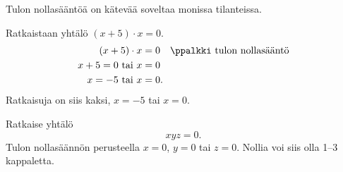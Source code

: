 

Tulon nollasääntöä on kätevää soveltaa monissa tilanteissa.

\begin{esimerkki} Ratkaistaan yhtälö $(x+5) \cdot x =0 $.
    \begin{align*}
        (x+5)\cdot x &=0 \quad \ppalkki \text{ tulon nollasääntö} \\
        x +5= 0 \text{ tai } x &=0 \\
        x= -5 \text{ tai } x &=0.
    \end{align*}
    Ratkaisuja on siis kaksi, $x= -5$ tai $x= 0$.
\end{esimerkki}



\begin{esimerkki} Ratkaise yhtälö
    \[xyz=0.\]
Tulon nollasäännön perusteella $x=0$, $y=0$ tai $z=0$. Nollia voi siis
olla 1--3 kappaletta.
\end{esimerkki}

